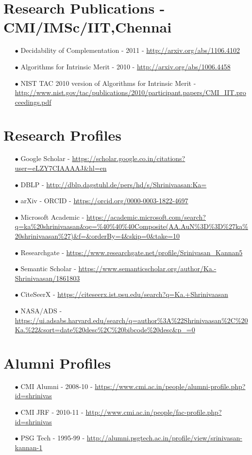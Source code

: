 \documentclass[11pt,onecolumn]{article}
\begin{document}
\section{Research Publications - CMI/IMSc/IIT,Chennai}
\begin{enumerate}
\item[$\bullet$] Decidability of Complementation - 2011 - \url {http://arxiv.org/abs/1106.4102}
\item[$\bullet$] Algorithms for Intrinsic Merit - 2010 - \url {http://arxiv.org/abs/1006.4458}
\item[$\bullet$] NIST TAC 2010 version of Algorithms for Intrinsic Merit - \\
 \url {http://www.nist.gov/tac/publications/2010/participant.papers/CMI_IIT.proceedings.pdf}
\end{enumerate}

\section{Research Profiles}
\begin{enumerate}
\item[$\bullet$] Google Scholar - \url {https://scholar.google.co.in/citations?user=eLZY7CIAAAAJ&hl=en }
\item[$\bullet$] DBLP - \url {http://dblp.dagstuhl.de/pers/hd/s/Shrinivaasan:Ka=}
\item[$\bullet$] arXiv - ORCID - \url {https://orcid.org/0000-0003-1822-4697}
\item[$\bullet$] Microsoft Academic - \url {https://academic.microsoft.com/search?q=ka%20shrinivaasan&qe=%40%40%40Composite(AA.AuN%3D%3D%27ka%20shrinivaasan%27)&f=&orderBy=4&skip=0&take=10}
\item[$\bullet$] Researchgate - \url {https://www.researchgate.net/profile/Srinivasan_Kannan5}
\item[$\bullet$] Semantic Scholar - \url {https://www.semanticscholar.org/author/Ka.-Shrinivaasan/1861803}
\item[$\bullet$] CiteSeerX - \url {https://citeseerx.ist.psu.edu/search?q=Ka.+Shrinivaasan}    
\item[$\bullet$] NASA/ADS - \url {https://ui.adsabs.harvard.edu/search/q=author%3A%22Shrinivaasan%2C%20Ka.%22&sort=date%20desc%2C%20bibcode%20desc&p_=0}

\end{enumerate}

\section{Alumni Profiles}
\begin{enumerate}
\item[$\bullet$] CMI Alumni - 2008-10 - \url {https://www.cmi.ac.in/people/alumni-profile.php?id=shrinivas}
\item[$\bullet$] CMI JRF - 2010-11 - \url {http://www.cmi.ac.in/people/fac-profile.php?id=shrinivas}
\item[$\bullet$] PSG Tech - 1995-99 - \url {http://alumni.psgtech.ac.in/profile/view/srinivasan-kannan-1}
\end{enumerate}
\end{document}
